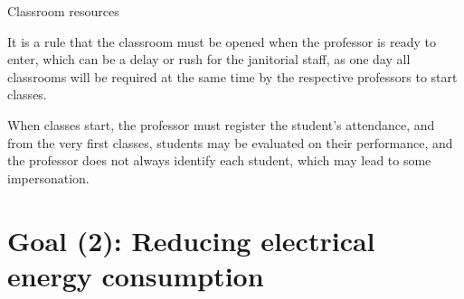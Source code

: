 \documentclass[notes=show, 10pt, xcolor=table]{beamer}
\begin{document}
\begin{frame}{Classroom resources}
{           It is a rule that the classroom must be opened when the professor is ready to enter, which can be a delay or rush for the janitorial staff, as one day all classrooms will be required at the same time by the respective professors to start classes.
           
           When classes start, the professor must register the student's attendance, and from the very first classes, students may be evaluated on their performance, and the professor does not always identify each student, which may lead to some impersonation.
        }
    \end{frame}

\section{Goal (2): Reducing electrical energy consumption}
\end{document}
